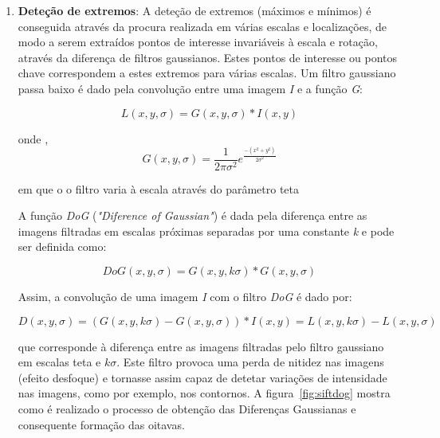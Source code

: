 \begin{enumerate}
\item \textbf{Deteção de extremos}:  A deteção de extremos (máximos e mínimos) é conseguida através da procura realizada em várias escalas e localizações, de modo a serem extraídos pontos de interesse invariáveis à escala e rotação, através da diferença de filtros gaussianos. Estes pontos de interesse ou pontos chave correspondem a estes extremos para várias escalas. 
Um filtro gaussiano passa baixo é dado pela convolução entre uma imagem \textit{I} e a função \textit{G}:

\begin{equation}
L\left ( x, y, \sigma  \right ) = G\left ( x, y, \sigma  \right ) * I\left ( x, y \right )
\end{equation}

onde ,
\begin{equation}
G\left ( x, y, \sigma  \right ) = \frac{1}{2\pi \sigma^2} e^\frac{-\left ( x^2 + y^2 \right )}{2\sigma^2} 
\end{equation}

em que o o filtro varia à escala através do parâmetro teta

A função \textit{DoG} (\textit{"Diference of Gaussian"}) é dada pela diferença entre as imagens filtradas em escalas próximas separadas por uma constante \textit{k} e pode ser definida como:

\begin{equation}
DoG\left ( x, y, \sigma  \right ) = G\left ( x, y, k\sigma  \right ) * G\left ( x, y, \sigma \right )
\end{equation}

Assim, a convolução de uma imagem \textit{I} com o filtro \textit{DoG} é dado por:

\begin{equation}
D\left ( x, y, \sigma  \right ) = \left (  G\left ( x, y, k\sigma  \right ) - G\left ( x, y, \sigma \right ) \right )* I\left ( x, y \right ) = L\left ( x, y, k\sigma  \right ) - L\left ( x, y, \sigma  \right )
\end{equation}

que corresponde à diferença entre as imagens filtradas pelo filtro gaussiano em escalas teta e $ k\sigma $. Este filtro provoca uma perda de nitidez nas imagens (efeito desfoque) e tornasse assim capaz de detetar variações de intensidade nas imagens, como por exemplo, nos contornos. A figura~\ref{fig:siftdog} mostra como é realizado o processo de obtenção das Diferenças Gaussianas e consequente formação das oitavas. 


\end{enumerate}
